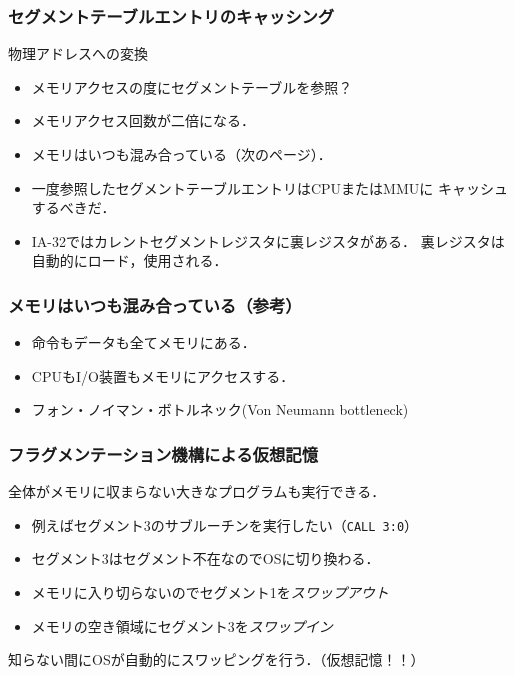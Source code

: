 \documentclass{beamer}                   %
\begin{document}
\begin{frame}
  \frametitle{セグメントテーブルエントリのキャッシング}
  物理アドレスへの変換
  \begin{itemize}
  \item メモリアクセスの度にセグメントテーブルを参照？
  \item メモリアクセス回数が二倍になる．
  \item メモリはいつも混み合っている（次のページ）．
  \item 一度参照したセグメントテーブルエントリはCPUまたはMMUに
    キャッシュするべきだ．
  \item IA-32ではカレントセグメントレジスタに裏レジスタがある．
    裏レジスタは自動的にロード，使用される．
  \end{itemize}
\end{frame}

\begin{frame}
  \frametitle{メモリはいつも混み合っている（参考）}

  \begin{itemize}
  \item 命令もデータも全てメモリにある．
  \item CPUもI/O装置もメモリにアクセスする．
  \item フォン・ノイマン・ボトルネック(Von Neumann bottleneck)
  \end{itemize}
\end{frame}

\begin{frame}
  \frametitle{フラグメンテーション機構による仮想記憶}

  全体がメモリに収まらない大きなプログラムも実行できる．
  \begin{itemize}
  \item 例えばセグメント3のサブルーチンを実行したい（\texttt{CALL 3:0}）
  \item セグメント3はセグメント不在なのでOSに切り換わる．
  \item メモリに入り切らないのでセグメント1を\emph{スワップアウト}
  \item メモリの空き領域にセグメント3を\emph{スワップイン}
  \end{itemize}
  知らない間にOSが自動的にスワッピングを行う．（仮想記憶！！）
\end{frame}
\end{document}
